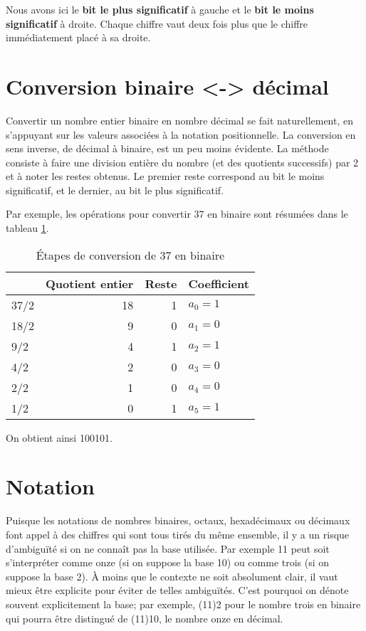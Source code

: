\documentclass[letter, oneside]{book}
\begin{document}
Nous avons ici le \textbf{bit le plus significatif} à gauche et le \textbf{bit le
moins significatif} à droite. Chaque chiffre vaut deux fois plus que le
chiffre immédiatement placé à sa droite.

\section{Conversion binaire <-> décimal}
\label{sec:org36e9369}

Convertir un nombre entier binaire en nombre décimal se fait
naturellement, en s'appuyant sur les valeurs associées à la notation
positionnelle. La conversion en sens inverse, de décimal à binaire,
est un peu moins évidente. La méthode consiste à faire une division
entière du nombre (et des quotients successifs) par 2 et à noter les
restes obtenus. Le premier reste correspond au bit le moins
significatif, et le dernier, au bit le plus significatif.

Par exemple, les opérations pour convertir 37 en binaire sont résumées
dans le tableau \ref{tab:orgaa11049}.

\begin{table}[htbp]
\caption{\label{tab:orgaa11049}Étapes de conversion de 37 en binaire}
\centering
\begin{tabular}{lrrl}
 & Quotient entier & Reste & Coefficient\\[0pt]
\hline
37/2 & 18 & 1 & \(a_0 = 1\)\\[0pt]
18/2 & 9 & 0 & \(a_1 = 0\)\\[0pt]
9/2 & 4 & 1 & \(a_2 = 1\)\\[0pt]
4/2 & 2 & 0 & \(a_3 = 0\)\\[0pt]
2/2 & 1 & 0 & \(a_4 = 0\)\\[0pt]
1/2 & 0 & 1 & \(a_5 = 1\)\\[0pt]
\end{tabular}
\end{table}

On obtient ainsi 100101.

\section{Notation}
\label{sec:org070254d}

Puisque les notations de nombres binaires, octaux, hexadécimaux ou
décimaux font appel à des chiffres qui sont tous tirés du même
ensemble, il y a un risque d'ambiguïté si on ne connaît pas la base
utilisée. Par exemple 11 peut soit s'interpréter comme onze (si on
suppose la base 10) ou comme trois (si on suppose la base 2). À
moins que le contexte ne soit absolument clair, il vaut mieux être
explicite pour éviter de telles ambiguïtés. C'est pourquoi on dénote
souvent explicitement la base; par exemple, (11)2 pour le nombre
trois en binaire qui pourra être distingué de (11)10, le nombre onze
en décimal.
\end{document}

